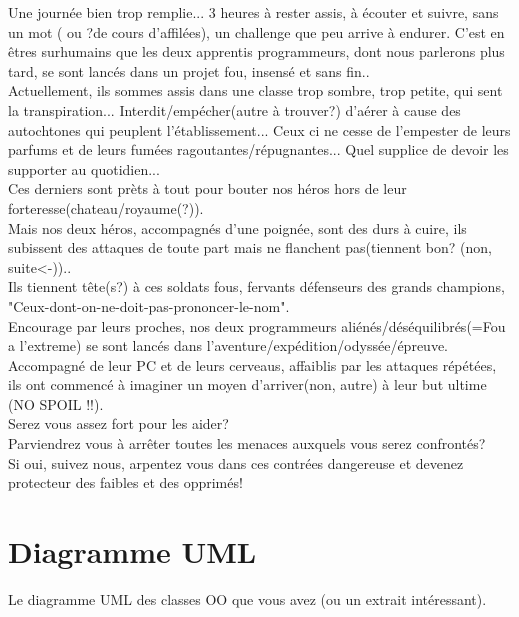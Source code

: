 \documentclass[a4paper,titlepage]{article}
\begin{document}
	Une journée bien trop remplie... 3 heures à rester assis, à écouter et suivre, sans un mot ( ou ?de cours d'affilées), un challenge que peu arrive à endurer. C'est en êtres surhumains que les deux apprentis programmeurs, dont nous parlerons plus tard, se sont lancés dans un projet fou, insensé et sans fin..\\
	
	Actuellement, ils sommes assis dans une classe trop sombre, trop petite, qui sent la transpiration... Interdit/empécher(autre à trouver?) d'aérer à cause des autochtones qui peuplent l'établissement... Ceux ci ne cesse de l'empester de leurs parfums et de leurs fumées ragoutantes/répugnantes... Quel supplice de devoir les supporter au quotidien...\\
	Ces derniers sont prèts à tout pour bouter nos héros hors de leur forteresse(chateau/royaume(?)).\\
	
	Mais nos deux héros, accompagnés d'une poignée, sont des durs à cuire, ils subissent des attaques de toute part mais ne flanchent pas(tiennent bon? (non, suite<-))..\\ 
	Ils tiennent tête(s?) à ces soldats fous, fervants défenseurs des grands champions, "Ceux-dont-on-ne-doit-pas-prononcer-le-nom".\\
	
	Encourage par leurs proches, nos deux programmeurs aliénés/déséquilibrés(=Fou a l'extreme) se sont lancés dans l'aventure/expédition/odyssée/épreuve.\\
	Accompagné de leur PC et de leurs cerveaus, affaiblis par les attaques répétées, ils ont commencé à imaginer un moyen d'arriver(non, autre) à leur but ultime (NO SPOIL !!).\\
	
	Serez vous assez fort pour les aider?\\
	
	Parviendrez vous à arrêter toutes les menaces auxquels vous serez confrontés?\\
	Si oui, suivez nous, arpentez vous dans ces contrées dangereuse et devenez protecteur des faibles et des opprimés!
	
	\clearpage
	\section{Diagramme UML}
	Le diagramme UML des classes OO que vous avez (ou un extrait intéressant).\\
	\clearpage
	
\end{document}

